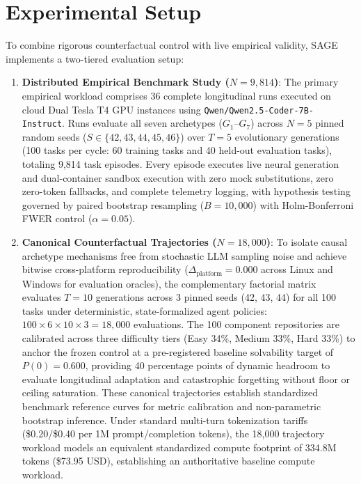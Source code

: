 \documentclass[conference]{IEEEtran}
\begin{document}
\section{Experimental Setup}
\label{sec:setup}
To combine rigorous counterfactual control with live empirical validity, SAGE implements a two-tiered evaluation setup:
\begin{enumerate}
    \item \textbf{Distributed Empirical Benchmark Study ($N=9{,}814$)}: The primary empirical workload comprises 36 complete longitudinal runs executed on cloud Dual Tesla T4 GPU instances using \texttt{Qwen/Qwen2.5-Coder-7B-Instruct}. Runs evaluate all seven archetypes ($G_1\text{--}G_7$) across $N=5$ pinned random seeds ($S \in \{42, 43, 44, 45, 46\}$) over $T=5$ evolutionary generations (100 tasks per cycle: 60 training tasks and 40 held-out evaluation tasks), totaling 9,814 task episodes. Every episode executes live neural generation and dual-container sandbox execution with zero mock substitutions, zero zero-token fallbacks, and complete telemetry logging, with hypothesis testing governed by paired bootstrap resampling ($B=10{,}000$) with Holm-Bonferroni FWER control ($\alpha=0.05$).
    \item \textbf{Canonical Counterfactual Trajectories ($N=18{,}000$)}: To isolate causal archetype mechanisms free from stochastic LLM sampling noise and achieve bitwise cross-platform reproducibility ($\Delta_{\text{platform}} = 0.000$ across Linux and Windows for evaluation oracles), the complementary factorial matrix evaluates $T=10$ generations across 3 pinned seeds (42, 43, 44) for all 100 tasks under deterministic, state-formalized agent policies: $100 \times 6 \times 10 \times 3 = 18{,}000$ evaluations. The 100 component repositories are calibrated across three difficulty tiers (Easy 34\%, Medium 33\%, Hard 33\%) to anchor the frozen control at a pre-registered baseline solvability target of $P(0) = 0.600$, providing 40 percentage points of dynamic headroom to evaluate longitudinal adaptation and catastrophic forgetting without floor or ceiling saturation. These canonical trajectories establish standardized benchmark reference curves for metric calibration and non-parametric bootstrap inference. Under standard multi-turn tokenization tariffs (\$0.20/\$0.40 per 1M prompt/completion tokens), the 18,000 trajectory workload models an equivalent standardized compute footprint of 334.8M tokens (\$73.95 USD), establishing an authoritative baseline compute workload.
\end{enumerate}
\end{document}
